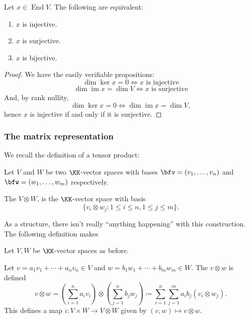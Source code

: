 \documentclass{article}
\DeclareMathOperator{\End}{End}
\DeclareMathOperator{\im}{im}
\begin{document}
\begin{corollary}
    Let $x \in \End V$.
    The following are equivalent:
    \begin{enumerate}[label=(\alph*)]
        \item
            $x$ is injective.
        \item
            $x$ is surjective.
        \item
            $x$ is bijective.
    \end{enumerate}
\end{corollary}

\begin{proof}
    We have the easily verifiable propositions:
    \[
        \dim \ker x = 0 \iff x \text{ is injective}
    \]
    \[
        \dim \im x = \dim V \iff x \text{ is surjective}
    \]
    And, by rank nullity,
    \[
        \dim \ker x = 0
        \iff
        \dim \im x = \dim V,
    \]
    hence $x$ is injective if and only if it is surjective.
\end{proof}

\subsubsection{The matrix representation}

We recall the definition of a tensor product:

\begin{definition}
    Let $V$ and $W$ be two $\KK$-vector spaces with bases $\bfv = (v_1,\ldots,v_n)$ and $\bfw = (w_1,\ldots,w_m)$ respectively.

    The  $V \otimes W$, is the $\KK$-vector space with basis
    \[
        \Big\{
            v_i \otimes w_j: 1 \leq i \leq n, 1 \leq j \leq m
        \Big\}.
    \]
\end{definition}

As a structure, there isn't really ``anything happening'' with this construction.
The following definition makes 

\begin{definition}
    Let $V, W$ be $\KK$-vector spaces as before.

    Let $v = a_1v_1 + \cdots + a_nv_n \in V$ and $w = b_1w_1 + \cdots + b_mw_m \in W$.
    The  $v \otimes w$ is defined 
    \[
        v \otimes w
        =
        \left(
            \sum_{i=1}^n
            a_iv_i
        \right)
        \otimes
        \left(
            \sum_{j=1}^n
            b_jw_j
        \right)
        \coloneq
        \sum_{i=1}^n
        \sum_{j=1}^m
        a_ib_j (v_i \otimes w_j).
    \]
    This defines a map $i: V \times W \to V \otimes W$ given by $(v, w) \mapsto v \otimes w$.
\end{definition}
\end{document}
